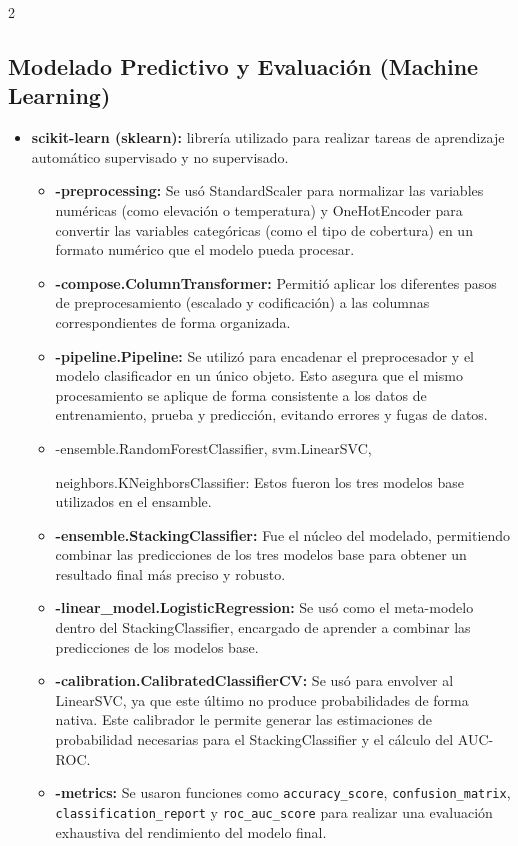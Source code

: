\documentclass[a4paper,10pt]{article}
\begin{document}
\begin{multicols}{2}
\subsection{Modelado Predictivo y Evaluación (Machine Learning)}
\begin{itemize}
    \item \textbf{scikit-learn (sklearn):} librería utilizado para realizar tareas de aprendizaje automático supervisado y no supervisado.
    \begin{itemize}
        \item \textbf{-preprocessing:} Se usó StandardScaler para normalizar las variables numéricas (como elevación o temperatura) y OneHotEncoder para convertir las variables categóricas (como el tipo de cobertura) en un formato numérico que el modelo pueda procesar.
        \item \textbf{-compose.ColumnTransformer:} Permitió aplicar los diferentes pasos de preprocesamiento (escalado y codificación) a las columnas correspondientes de forma organizada. 
        \item \textbf{-pipeline.Pipeline:} Se utilizó para encadenar el preprocesador y el modelo clasificador en un único objeto. Esto asegura que el mismo procesamiento se aplique de forma consistente a los datos de entrenamiento, prueba y predicción, evitando errores y fugas de datos.
        \item -ensemble.RandomForestClassifier, svm.LinearSVC,
        
        neighbors.KNeighborsClassifier: Estos fueron los tres modelos base utilizados en el ensamble.
        \item \textbf{-ensemble.StackingClassifier:} Fue el núcleo del modelado, permitiendo combinar las predicciones de los tres modelos base para obtener un resultado final más preciso y robusto.
        \item \textbf{-linear\_model.LogisticRegression:} Se usó como el meta-modelo dentro del StackingClassifier, encargado de aprender a combinar las predicciones de los modelos base.
        \item \textbf{-calibration.CalibratedClassifierCV:} Se usó para envolver al LinearSVC, ya que este último no produce probabilidades de forma nativa. Este calibrador le permite generar las estimaciones de probabilidad necesarias para el StackingClassifier y el cálculo del AUC-ROC.
        \item \textbf{-metrics:} Se usaron funciones como \texttt{accuracy\_score}, \texttt{confusion\_matrix}, \texttt{classification\_report} y \texttt{roc\_auc\_score} para realizar una evaluación exhaustiva del rendimiento del modelo final.
    \end{itemize}
\end{itemize}

\end{multicols}
\end{document}
